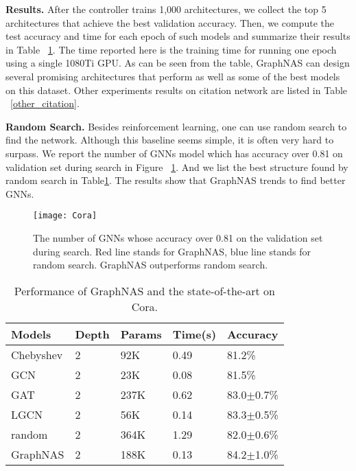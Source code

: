 \documentclass{article}
\begin{document}
\textbf{Results.} After the controller trains 1,000 architectures, we collect the top 5 architectures that achieve the best validation accuracy. Then, we compute the test accuracy and time for each epoch of such models and summarize their results in Table ~\ref{table:cora}. The time reported here is the training time for running one epoch using a single 1080Ti GPU. As can be seen from the table, GraphNAS can design several promising architectures that perform as well as some of the best models on this dataset.
Other experiments results on citation network are listed in Table ~\ref{other_citation}. 

\textbf{Random Search.} Besides reinforcement learning, one can use random search to find the network. Although this baseline seems simple, it is often very hard to surpass. We report the number of GNNs model which has accuracy over 0.81 on validation set during search in Figure ~\ref{fig:random}. And we list the best structure found by random search in Table\ref{table:cora}. The results show that GraphNAS trends to find better GNNs.
\begin{figure}
	\texttt{[image: Cora]}
	\caption{The number of GNNs whose accuracy over 0.81 on the validation set during search. Red line stands for GraphNAS, blue line stands for random search. GraphNAS outperforms random search. }
	\label{fig:random}
\end{figure}
\begin{table}[]
	\caption{Performance of GraphNAS and the state-of-the-art on Cora.}
	\label{table:cora}
	\begin{tabular}{l|ll|ll}
		\hline
		Models    & Depth & Params &  Time(s) & Accuracy   \\ \hline
		Chebyshev &   2    &      92K   & 0.49   & 81.2\%       \\
		GCN      &    2   &     23K & 0.08  & 81.5\%       \\
		GAT       &    2   &    237K & 0.62 & 83.0$\pm$0.7\% \\
		LGCN      &  2      &    56K        & 0.14 & 83.3$\pm$0.5\% \\ \hline
random & 2  &        364K          &	1.29		&82.0$\pm$0.6\%				\\
		GraphNAS   &  2   &  188K         &   0.13 &  84.2$\pm$1.0\%         \\ \hline
		
	\end{tabular}
\end{table}
\end{document}

